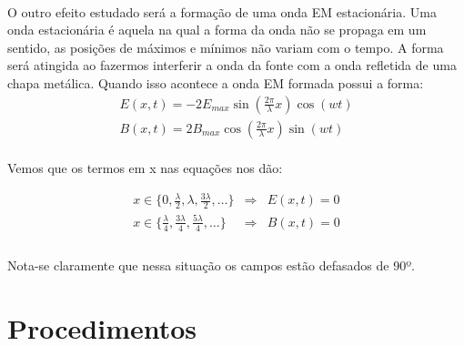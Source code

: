 \documentclass[a4paper,11pt]{article}
\begin{document}
	\paragraph{} O outro efeito estudado será a formação de uma onda EM estacionária. Uma onda estacionária é aquela na qual a forma da onda não se propaga em um sentido, as posições de máximos e mínimos não variam com o tempo. A forma será atingida ao fazermos interferir a onda da fonte com a onda refletida de uma chapa metálica. Quando isso acontece a onda EM formada possui a forma:
	\begin{equation}
	\begin{array}{c}
		E(x,t) = -2 E_{max}\sin(\frac{2\pi}{\lambda}x)\cos(wt) \\
		B(x,t) = 2 B_{max}\cos(\frac{2\pi}{\lambda}x)\sin(wt)	
	\end{array}
	\label{formula-estacionaria}
	\end{equation}
	
	\paragraph{}Vemos que os termos em x nas equações nos dão:
	
	\begin{displaymath}
	\begin{array}{lcr}
		x \in \{ 0, \frac{\lambda}{2}, \lambda, \frac{3\lambda}{2}, \ldots  \} & \Rightarrow & E(x,t) = 0 \\
		x \in \{\frac{\lambda}{4}, \frac{3\lambda}{4},\frac{5\lambda}{4},  \ldots  \} & \Rightarrow & B(x,t) = 0 \\		
	\end{array}
	\end{displaymath}
	
	\paragraph{} Nota-se claramente que nessa situação os campos estão defasados de 90º. 
	
	


\newpage
\section{Procedimentos}
\end{document}
